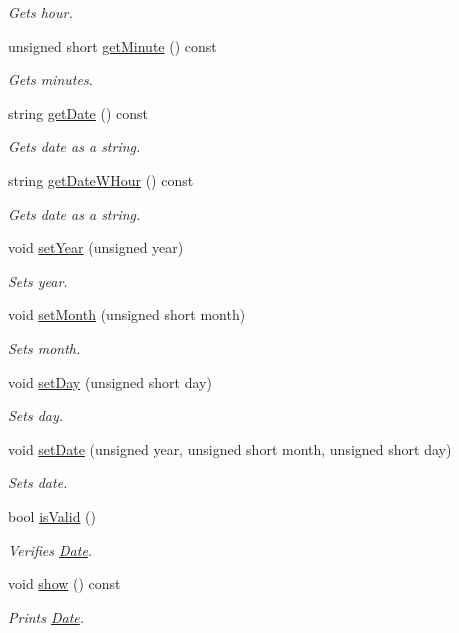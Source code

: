 \begin{DoxyCompactItemize}
\begin{DoxyCompactList}\small\item\em Gets hour. \end{DoxyCompactList}\item 
unsigned short \hyperlink{class_date_aa4d5c4e15ec04ff5fa18755d76acefe0}{get\+Minute} () const
\begin{DoxyCompactList}\small\item\em Gets minutes. \end{DoxyCompactList}\item 
string \hyperlink{class_date_ac33192f734973548e97e9b5d8da44a5b}{get\+Date} () const
\begin{DoxyCompactList}\small\item\em Gets date as a string. \end{DoxyCompactList}\item 
string \hyperlink{class_date_a1c481aea42a3a310364f9a97661bee14}{get\+Date\+W\+Hour} () const
\begin{DoxyCompactList}\small\item\em Gets date as a string. \end{DoxyCompactList}\item 
void \hyperlink{class_date_a262bd42a1ed4378fa115dab321096736}{set\+Year} (unsigned year)
\begin{DoxyCompactList}\small\item\em Sets year. \end{DoxyCompactList}\item 
void \hyperlink{class_date_a6f2ab890b1935488aaa604b77caac4ae}{set\+Month} (unsigned short month)
\begin{DoxyCompactList}\small\item\em Sets month. \end{DoxyCompactList}\item 
void \hyperlink{class_date_a61e8103c09406f067992e15f36a7f910}{set\+Day} (unsigned short day)
\begin{DoxyCompactList}\small\item\em Sets day. \end{DoxyCompactList}\item 
void \hyperlink{class_date_a8c5fc0dd7ecf3bae6a1de5146fc566e4}{set\+Date} (unsigned year, unsigned short month, unsigned short day)
\begin{DoxyCompactList}\small\item\em Sets date. \end{DoxyCompactList}\item 
bool \hyperlink{class_date_a7d9aaa9db591413e21c8b85fdae130ad}{is\+Valid} ()
\begin{DoxyCompactList}\small\item\em Verifies \hyperlink{class_date}{Date}. \end{DoxyCompactList}\item 
void \hyperlink{class_date_a37f8fc7ca1692df7a8b265099c061721}{show} () const
\begin{DoxyCompactList}\small\item\em Prints \hyperlink{class_date}{Date}. \end{DoxyCompactList}\end{DoxyCompactItemize}


